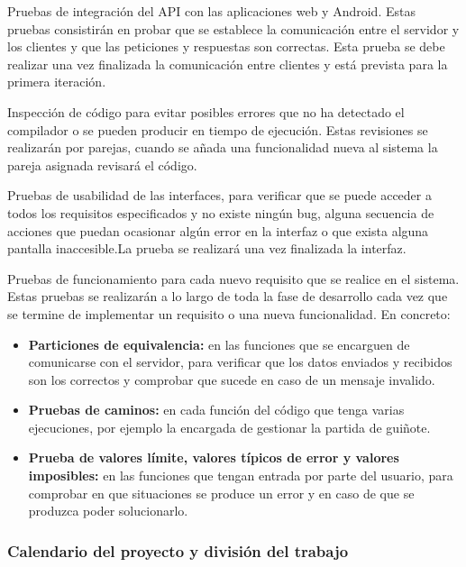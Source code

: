 \documentclass{article}
\begin{document}
Pruebas de integración del API con las aplicaciones web y Android. Estas pruebas consistirán en probar que se establece la comunicación entre el servidor y los clientes y que las peticiones y respuestas son correctas. Esta prueba se debe realizar una vez finalizada la comunicación entre clientes y está prevista para la primera iteración.

Inspección de código para evitar posibles errores que no ha detectado el compilador o se pueden producir en tiempo de ejecución. Estas revisiones se realizarán por parejas, cuando se añada una funcionalidad nueva al sistema la pareja asignada revisará el código.

Pruebas de usabilidad de las interfaces, para verificar que se puede acceder a todos los requisitos especificados y no existe ningún bug, alguna secuencia de acciones que puedan ocasionar algún error en la interfaz o que exista alguna pantalla inaccesible.La prueba se realizará una vez finalizada la interfaz.

Pruebas de funcionamiento para cada nuevo requisito que se realice en el sistema. Estas pruebas se realizarán a lo largo de toda la fase de desarrollo cada vez que se termine de implementar un requisito o una nueva funcionalidad. En concreto:
\begin{itemize}
	\item \textbf{Particiones de equivalencia:} en las funciones que se encarguen de comunicarse con el servidor, para verificar que los datos enviados y recibidos son los correctos y comprobar que sucede en caso de un mensaje invalido.
	\item \textbf{Pruebas de caminos:} en cada función del código que tenga varias ejecuciones, por ejemplo la encargada de gestionar la partida de guiñote.
	\item \textbf{Prueba de valores límite, valores típicos de error y valores imposibles:} en las funciones que tengan entrada por parte del usuario, para comprobar en que situaciones se produce un error y en caso de que se produzca poder solucionarlo.
\end{itemize}

\subsubsection{Calendario del proyecto y división del trabajo}
\end{document}
